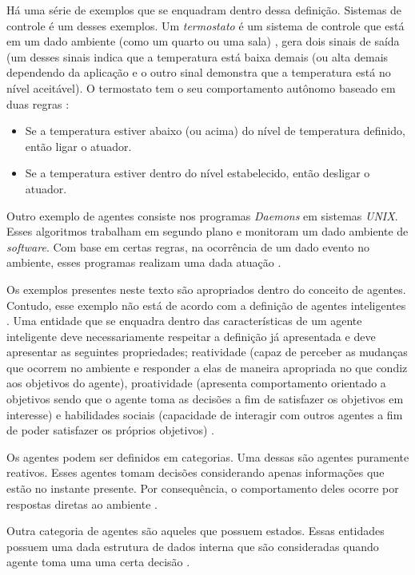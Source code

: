 Há uma série de exemplos que se enquadram dentro dessa definição. Sistemas de controle é um desses exemplos. Um \textit{termostato} é um sistema de controle que está em um dado ambiente (como um quarto ou uma sala) \cite{whatisagent}, gera dois sinais de saída (um desses sinais indica que a temperatura está baixa demais (ou alta demais dependendo da aplicação e o outro sinal
demonstra que a temperatura está no nível aceitável). O termostato tem o seu comportamento autônomo baseado em duas regras \cite{whatisagent}:

\begin{itemize}
    \item Se a temperatura estiver abaixo (ou acima) do nível de temperatura definido, então ligar o atuador.
    \item Se a temperatura estiver dentro do nível estabelecido, então desligar o atuador.
\end{itemize}

Outro exemplo de agentes consiste nos programas \textit{Daemons} em sistemas \textit{UNIX}. Esses algoritmos trabalham em segundo plano e monitoram um dado ambiente de \textit{software}. Com base em certas regras, na ocorrência de um dado evento no ambiente, esses programas realizam uma dada atuação \cite{whatisagent}.   

Os exemplos presentes neste texto são apropriados dentro do conceito de agentes. Contudo, esse exemplo não está de acordo com a definição de agentes inteligentes \cite{whatisagent}. Uma entidade que se enquadra dentro das características de um agente inteligente deve necessariamente respeitar a definição já apresentada e deve apresentar as seguintes propriedades; reatividade (capaz de perceber as mudanças
que ocorrem no ambiente e responder a elas de maneira apropriada no que condiz aos objetivos do agente), proatividade (apresenta comportamento orientado a objetivos sendo que o agente toma as decisões a fim de satisfazer os objetivos em interesse) e habilidades sociais (capacidade de interagir com outros agentes a fim de poder satisfazer os próprios objetivos) \cite{whatisagent} \cite{artificialinteligencemodermapproach}.

Os agentes podem ser definidos em categorias. Uma dessas são agentes puramente reativos. Esses agentes tomam decisões considerando apenas informações que estão no instante presente. Por consequência, o comportamento deles ocorre por respostas diretas ao ambiente \cite{whatisagent}. 

Outra categoria de agentes são aqueles que possuem estados. Essas entidades possuem uma dada estrutura de dados interna que são consideradas quando agente toma uma uma certa decisão \cite{whatisagent}.

